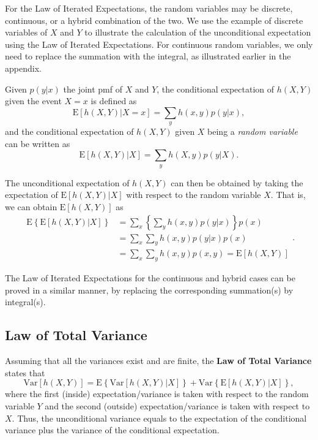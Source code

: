 \documentclass[]{book}
\theoremstyle{definition}
\theoremstyle{definition}
\theoremstyle{definition}
\theoremstyle{remark}
\begin{document}
For the Law of Iterated Expectations, the random variables may be
discrete, continuous, or a hybrid combination of the two. We use the
example of discrete variables of \(X\) and \(Y\) to illustrate the
calculation of the unconditional expectation using the Law of Iterated
Expectations. For continuous random variables, we only need to replace
the summation with the integral, as illustrated earlier in the appendix.

Given \(p(y|x)\) the joint pmf of \(X\) and \(Y\), the conditional
expectation of \(h(X,Y)\) given the event \(X=x\) is defined as
\[\mathrm{E} \left[ h(X,Y) | X=x \right] = \sum_y h(x,y) p(y|x),\] and
the conditional expectation of \(h(X,Y)\) given \(X\) being a
\emph{random variable} can be written as
\[\mathrm{E} \left[ h(X,Y) | X \right] = \sum_y h(X,y) p(y|X).\]

The unconditional expectation of \(h(X,Y)\) can then be obtained by
taking the expectation of \(\mathrm{E} \left[ h(X,Y) | X \right]\) with
respect to the random variable \(X\). That is, we can obtain
\(\mathrm{E}[ h(X,Y)]\) as \[\begin{aligned}
     \mathrm{E} \left\{ \mathrm{E} \left[ h(X,Y) | X \right] \right \}
    &= \sum_x  \left\{\sum_y h(x,y) p(y|x) \right \} p(x) \\
    &= \sum_x  \sum_y h(x,y) p(y|x)p(x) \\
    &=  \sum_x  \sum_y h(x,y) p(x,y)
    =  \mathrm{E}[h(X,Y)] \end{aligned}.\]

The Law of Iterated Expectations for the continuous and hybrid cases can
be proved in a similar manner, by replacing the corresponding
summation(s) by integral(s).

\subsection{Law of Total Variance}\label{law-of-total-variance}

Assuming that all the variances exist and are finite, the \textbf{Law of
Total Variance} states that
\[\mathrm{Var}[h(X,Y)]= \mathrm{E} \left\{ \mathrm{Var} \left[h(X,Y) | X \right] \right \}
    +\mathrm{Var} \left\{ \mathrm{E} \left[ h(X,Y) | X \right] \right \},\]
where the first (inside) expectation/variance is taken with respect to
the random variable \(Y\) and the second (outside) expectation/variance
is taken with respect to \(X\). Thus, the unconditional variance equals
to the expectation of the conditional variance plus the variance of the
conditional expectation.
\end{document}
